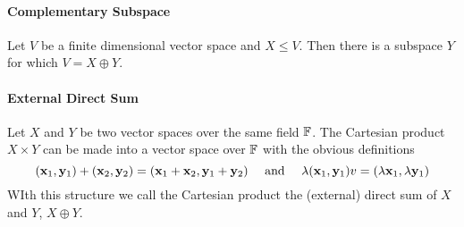 \paragraph{Complementary Subspace}
Let \(V\) be a finite dimensional vector space and \(X \leq V\). Then there is a subspace \(Y\) for which \(V = X \oplus Y\).

\paragraph{External Direct Sum}
Let \(X\) and \(Y\) be two vector spaces over the same field \(\mathbb{F}\). The Cartesian product \(X \times Y\) can be made into a vector space over \(\mathbb{F}\) with the obvious definitions
\[(\mathbf{x}_1, \mathbf{y}_1) + (\mathbf{x}_2, \mathbf{y}_2) = (\mathbf{x}_1 + \mathbf{x}_2, \mathbf{y}_1 + \mathbf{y}_2) \quad \text{ and } \quad \lambda(\mathbf{x}_1, \mathbf{y}_1)v = (\lambda\mathbf{x}_1, \lambda\mathbf{y}_1)\]
WIth this structure we call the Cartesian product the (external) direct sum of \(X\) and \(Y\), \(X \oplus Y\). 